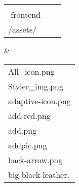 \documentclass[conference]{IEEEtran}
\begin{document}
\begin{table}[p]
    \begin{tabular}{p{2cm}|p{3cm}|p{2.5cm}}
    \hline
    \begin{tabular}[c]{@{}l@{}}StyleReserve\\-frontend\\/assets/\end{tabular} & \begin{tabular}[c]{@{}l@{}}All_icon.png\\Styler_img.png\\adaptive-icon.png\\add-red.png\\add.png\\addpic.png\\back-arrow.png\\big-black-leather.
\end{tabular}
\end{table}
\end{document}
